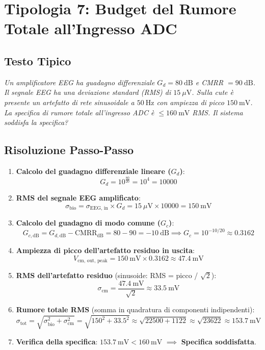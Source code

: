 \documentclass[10pt, letterpaper]{report}
\begin{document}
\section{Tipologia 7: Budget del Rumore Totale all'Ingresso ADC}

\subsection*{Testo Tipico}
\emph{Un amplificatore EEG ha guadagno differenziale $G_d = 80\ \text{dB}$ e CMRR $= 90\ \text{dB}$.
Il segnale EEG ha una deviazione standard (RMS) di $15\ \mu\text{V}$.
Sulla cute è presente un artefatto di rete sinusoidale a $50\ \text{Hz}$ con ampiezza di picco $150\ \text{mV}$.
La specifica di rumore totale all'ingresso ADC è $\leq 160\ \text{mV}$ RMS.
Il sistema soddisfa la specifica?}

\subsection*{Risoluzione Passo-Passo}
\begin{enumerate}
    \item \textbf{Calcolo del guadagno differenziale lineare ($G_d$)}:
    \[
    G_d = 10^{\frac{80}{20}} = 10^4 = 10000
    \]
    \item \textbf{RMS del segnale EEG amplificato}:
    \[
    \sigma_{\text{bio}} = \sigma_{\text{EEG, in}} \times G_d = 15\ \mu\text{V} \times 10000 = 150\ \text{mV}
    \]
    \item \textbf{Calcolo del guadagno di modo comune ($G_c$)}:
    \[
    G_{c,\text{dB}} = G_{d,\text{dB}} - \text{CMRR}_{\text{dB}} = 80 - 90 = -10\ \text{dB}
    \implies G_c = 10^{-10/20} \approx 0.3162
    \]
    \item \textbf{Ampiezza di picco dell'artefatto residuo in uscita}:
    \[
    V_{\text{cm, out, peak}} = 150\ \text{mV} \times 0.3162 \approx 47.4\ \text{mV}
    \]
    \item \textbf{RMS dell'artefatto residuo} (sinusoide: RMS = picco / $\sqrt{2}$):
    \[
    \sigma_{\text{cm}} = \frac{47.4\ \text{mV}}{\sqrt{2}} \approx 33.5\ \text{mV}
    \]
    \item \textbf{Rumore totale RMS} (somma in quadratura di componenti indipendenti):
    \[
    \sigma_{\text{tot}} = \sqrt{\sigma_{\text{bio}}^2 + \sigma_{\text{cm}}^2} = \sqrt{150^2 + 33.5^2} \approx \sqrt{22500 + 1122} \approx \sqrt{23622} \approx 153.7\ \text{mV}
    \]
    \item \textbf{Verifica della specifica}: $153.7\ \text{mV} < 160\ \text{mV}$ $\implies$ \textbf{Specifica soddisfatta}.
\end{enumerate}
\end{document}
